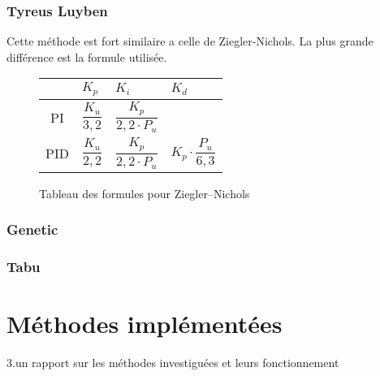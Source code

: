 \documentclass[a4paper,10pt]{report}
\begin{document}
\subsection{Tyreus Luyben}
Cette méthode est fort similaire a celle de Ziegler-Nichols. La plus grande différence est la formule utilisée.\cite{shahrokhi2013comparison}

\def\tabularxcolumn#1{m{#1}}
\begin{figure}[ht]
    \begin{center}
        \begin{tabularx}{\textwidth}{| c | X | X | X |}
            \hline
            & $K_p$ & $K_i$ & $K_d$\\ \hline
            PI & \begin{equation*}\frac{K_u}{3,2}\end{equation*} & \begin{equation*}\frac{K_p}{2,2 \cdot P_u}\end{equation*} &\\ \hline
            PID & \begin{equation*}\frac{K_u}{2,2}\end{equation*} & \begin{equation*}\frac{K_p}{2,2 \cdot P_u}\end{equation*} & \begin{equation*}K_p \cdot \frac{P_u}{6,3}\end{equation*} \\
            \hline
        \end{tabularx}
    \end{center}
    \caption{Tableau des formules pour Ziegler–Nichols}
    \label{tab:ZieglerNicholsTuningFormulas}
\end{figure}

\subsection{Genetic}

\subsection{Tabu}

\chapter{Méthodes implémentées}
3.un rapport sur les méthodes investiguées et leurs fonctionnement
\end{document}
